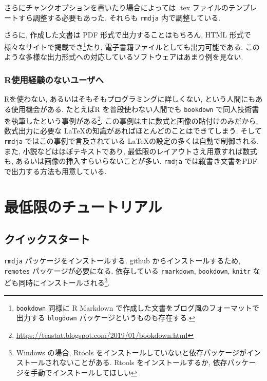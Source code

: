 \documentclass[
  xelatex,ja=standard,jafont=noto]{bxjsbook}
\theoremstyle{definition}
\theoremstyle{definition}
\theoremstyle{definition}
\theoremstyle{definition}
\theoremstyle{remark}
\begin{document}
さらにチャンクオプションを書いたり場合によっては .tex
ファイルのテンプレートすら調整する必要もあった. それらも \texttt{rmdja}
内で調整している.

さらに, 作成した文書は PDF 形式で出力することはもちろん, HTML
形式で様々なサイトで掲載でき\footnote{\texttt{bookdown} 同様に R
  Markdown で作成した文書をブログ風のフォーマットで出力する
  \texttt{blogdown} パッケージというものも存在する.}たり,
電子書籍ファイルとしても出力可能である.
このような多様な出力形式への対応しているソフトウェアはあまり例を見ない.

\hypertarget{rux4f7fux7528ux7d4cux9a13ux306eux306aux3044ux30e6ux30fcux30b6ux3078}{%
\section*{R使用経験のないユーザへ}\label{rux4f7fux7528ux7d4cux9a13ux306eux306aux3044ux30e6ux30fcux30b6ux3078}}

Rを使わない, あるいはそもそもプログラミングに詳しくない,
という人間にもある使用機会がある. たとえばR を普段使わない人間でも
\texttt{bookdown} で同人技術書を執筆したという事例がある\footnote{\url{https://teastat.blogspot.com/2019/01/bookdown.html}}.
この事例は主に数式と画像の貼付けのみだから, 数式出力に必要な
\LaTeX の知識があればほとんどのことはできてしまう. そして \texttt{rmdja}
ではこの事例で言及されている \LaTeX の設定の多くは自動で制御される.
また, 小説などはほぼテキストであり,
最低限のレイアウトさえ用意すれば数式も,
あるいは画像の挿入すらいらないことが多い. \texttt{rmdja}
では縦書き文書をPDFで出力する方法も用意している.

\hypertarget{part-ux6700ux4f4eux9650ux306eux30c1ux30e5ux30fcux30c8ux30eaux30a2ux30eb}{%
\part{
最低限のチュートリアル}\label{part-ux6700ux4f4eux9650ux306eux30c1ux30e5ux30fcux30c8ux30eaux30a2ux30eb}}

\hypertarget{quick-start}{%
\chapter{クイックスタート}\label{quick-start}}

\texttt{rmdja} パッケージをインストールする. github
からインストールするため, \texttt{remotes} パッケージが必要になる.
依存している \texttt{rmarkdown}, \texttt{bookdown}, \texttt{knitr}
なども同時にインストールされる\footnote{Windows の場合, Rtools
  をインストールしていないと依存パッケージがインストールされないことがある.
  Rtools をインストールするか,
  依存パッケージを手動でインストールしてほしい}.
\end{document}
